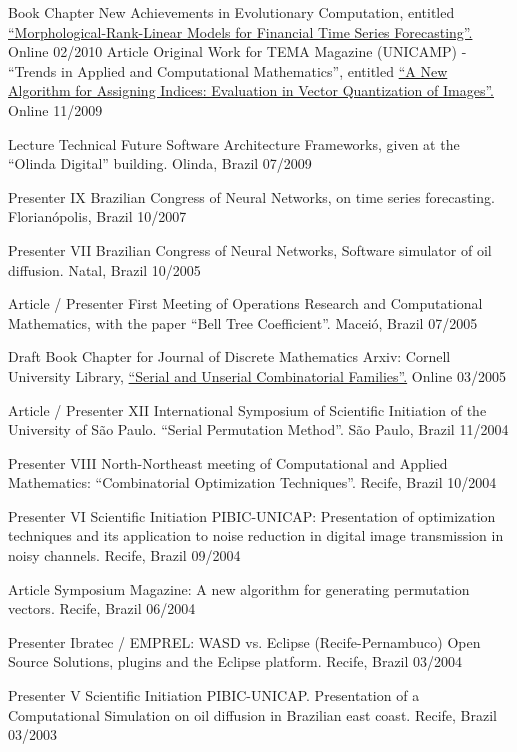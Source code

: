 
\begin{cvhonors}

  \cvhonor
    {Book Chapter}
    {New Achievements in Evolutionary Computation, entitled \href{http://www.intechopen.com/books/new-achievements-in-evolutionary-computation/morphological-rank-linear-models-for-financial-time-series-forecasting}{``Morphological-Rank-Linear Models for Financial Time Series Forecasting''.}}
    {Online}
    {02/2010}
  \cvhonor
    {Article}
    {Original Work for TEMA Magazine (UNICAMP) - ``Trends in Applied and Computational Mathematics'', entitled \href{https://tema.sbmac.org.br/tema/article/view/134/75}{``A New Algorithm for Assigning Indices: Evaluation in Vector Quantization of Images''.}}
    {Online}
    {11/2009}

   \cvhonor
   {Lecture}
   {Technical Future Software Architecture Frameworks, given at the ``Olinda Digital'' building.}
   {Olinda, Brazil}
   {07/2009}

   \cvhonor
   {Presenter}
   {IX Brazilian Congress of Neural Networks, on time series forecasting.}
   {Florianópolis, Brazil}
   {10/2007}

   \cvhonor
   {Presenter}
   {VII Brazilian Congress of Neural Networks, Software simulator of oil diffusion.}
   {Natal, Brazil}
   {10/2005}

   \cvhonor
   {Article / Presenter}
   {First Meeting of Operations Research and Computational Mathematics, with the paper ``Bell Tree Coefficient''.}
   {Maceió, Brazil}
   {07/2005}

   \cvhonor
   {Draft Book Chapter for Journal of Discrete Mathematics}
   {Arxiv: Cornell University Library, \href{http://arxiv.org/pdf/math/0503335v1.pdf}{``Serial and Unserial Combinatorial Families''.}}
   {Online}
   {03/2005}

   \cvhonor
   {Article / Presenter}
   {XII International Symposium of Scientific Initiation of the University of São Paulo. ``Serial Permutation Method''.}
   {São Paulo, Brazil}
   {11/2004}

   \cvhonor
   {Presenter}
   {VIII North-Northeast meeting of Computational and Applied Mathematics: ``Combinatorial Optimization Techniques''.}
   {Recife, Brazil}
   {10/2004}

   \cvhonor
   {Presenter}
   {VI Scientific Initiation PIBIC-UNICAP: Presentation of optimization techniques and its application to noise reduction in digital image transmission in noisy channels.}
   {Recife, Brazil}
   {09/2004}

   \cvhonor
   {Article}
   {Symposium Magazine: A new algorithm for generating permutation vectors.}
   {Recife, Brazil}
   {06/2004}

   \cvhonor
   {Presenter}
   {Ibratec / EMPREL: WASD vs. Eclipse (Recife-Pernambuco) Open Source Solutions, plugins and the Eclipse platform.}
   {Recife, Brazil}
   {03/2004}

   \cvhonor
   {Presenter}
   {V Scientific Initiation PIBIC-UNICAP. Presentation of a Computational Simulation on oil diffusion in Brazilian east coast.}
   {Recife, Brazil}
   {03/2003}

\end{cvhonors}
